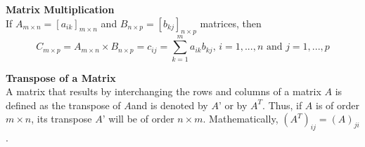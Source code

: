 \documentclass[12pt]{report}
\begin{document}
\begin{defn}
\textbf{Matrix Multiplication}\\
If $A_{m\times n} =[a_{ik}]_{m\times n}$ and $B_{n\times p}=[b_{kj}]_{n\times p}$ matrices,
then $$C_{m\times p} =A_{m\times n}\times B_{n\times p}=
c_{ij} =\sum _{k=1}^{m}a_{ik}b_{kj}, \,i = 1, ..., n \text{ and } j = 1, ..., p$$
\end{defn}
\begin{defn}
\textbf{Transpose of a Matrix}\\
A matrix that results by interchanging the rows and columns of a matrix $A$ is defined as the transpose of $A$and is denoted by $A’$ or by $A^T$. Thus, if $A$ is of order $m \times n$, its transpose $A’$ will be of order  $n \times m$. Mathematically, $(A^T )_{ij} = (A)_{ji}$.
\end{defn}
\end{document}
